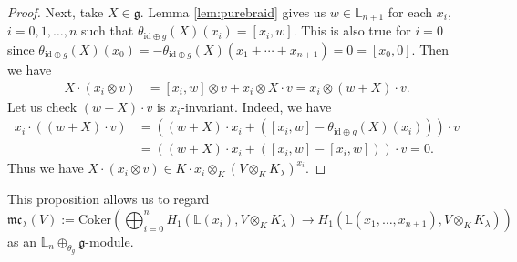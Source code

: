 \documentclass[a4paper,12pt]{article}
\theoremstyle{definition}
\theoremstyle{remark}
\begin{document}
\begin{proof}
Next, take $X\in \mathfrak{g}$. 
Lemma \ref{lem:purebraid} gives us $w\in \mathbb{L}_{n+1}$
for each $x_{i}$, $i=0,1,\ldots,n$
such that $\theta_{\mathrm{id}\oplus g}(X)(x_{i})=[x_{i},w]$.
This is also true for $i=0$ since $\theta_{\mathrm{id}\oplus g}(X)(x_{0})=-\theta_{\mathrm{id}\oplus g}(X)(x_{1}+\cdots+x_{n+1})=0=[x_{0},0]$.
Then we have  
\begin{align*}
	X\cdot (x_{i}\otimes v)&=[x_{i},w]\otimes v+x_{i}\otimes X\cdot v=x_{i}\otimes (w+X)\cdot v.
\end{align*}
Let us check $(w+X)\cdot v$ is $x_{i}$-invariant.
Indeed, we have 
\begin{align*}
	x_{i}\cdot ((w+X)\cdot v)&=((w+X)\cdot x_{i}+([x_{i},w]-\theta_{\mathrm{id}\oplus g}(X)(x_{i})))\cdot v\\
	&=((w+X)\cdot x_{i}+([x_{i},w]-[x_{i},w]))\cdot v=0.
\end{align*}
Thus we have 
$X\cdot (x_{i}\otimes v)\in K\cdot x_{i}\otimes_{K}(V\otimes_{K}K_{\lambda})^{x_{i}}$.
\end{proof}
This proposition allows us to regard  
\[
	\mathfrak{mc}_{\lambda}(V):=\mathrm{Coker}\left(
		\bigoplus_{i=0}^{n} H_1(\mathbb{L}(x_{i}), V\otimes_{K} K_{\lambda})\to H_1(\mathbb{L}(x_{1},\ldots,x_{n+1}), V\otimes_{K} K_{\lambda})	
	\right)
\]
as an $\mathbb{L}_{n}\oplus_{\theta_{g}}\mathfrak{g}$-module.
\end{document}
